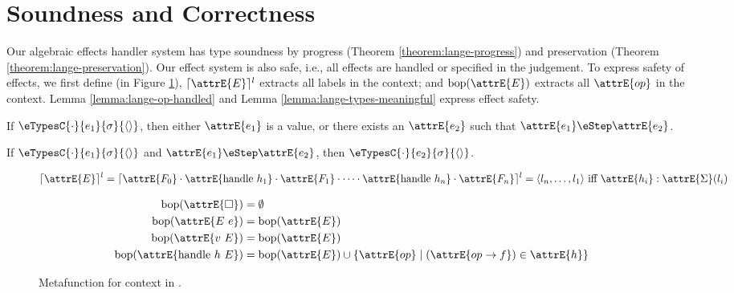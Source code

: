 \pagebreak
\section{Soundness and Correctness}

Our algebraic effects handler system has type soundness by progress
(Theorem \ref{theorem:lange-progress}) and preservation (Theorem
\ref{theorem:lange-preservation}). Our effect system is also safe, i.e., all
effects are handled or specified in the judgement. To express safety of effects,
we first define (in Figure \ref{fig:lange-metafunc}), $\lceil \attrE{E}
\rceil^l$ extracts all labels in the context; and $\text{bop}(\attrE{E})$
extracts all $\attrE{op}$ in the context. Lemma \ref{lemma:lange-op-handled} and
Lemma \ref{lemma:lange-types-meaningful} express effect safety.


\begin{theorem}
  \label{theorem:lange-progress}

  If $\eTypesC{\cdot}{e_1}{\sigma}{\langle \rangle}$, then either $\attrE{e_1}$ is a value, or there exists an $\attrE{e_2}$ such that $\attrE{e_1} \eStep \attrE{e_2}$.
\end{theorem}

\begin{theorem}
  \label{theorem:lange-preservation}

  If $\eTypesC{\cdot}{e_1}{\sigma}{\langle \rangle}$ and $\attrE{e_1} \eStep
  \attrE{e_2}$, then $\eTypesC{\cdot}{e_2}{\sigma}{\langle \rangle}$.
\end{theorem}

\begin{figure}
\[
  \lceil \attrE{E} \rceil^l = \lceil \attrE{F_0} \cdot \attrE{\text{handle} \ h_1} \cdot \attrE{F_1} \cdot \dots \cdot \attrE{\text{handle} \ h_n} \cdot \attrE{F_n} \rceil^l = \langle l_n, \dots, l_1 \rangle \text{ iff } \attrE{h_i} : \attrE{\Sigma}(l_i)
\]

\begin{align*}
  \text{bop}(\attrE{\square}) &= \emptyset \\
  \text{bop}(\attrE{E \ e}) &= \text{bop}(\attrE{E}) \\
  \text{bop}(\attrE{v \ E}) &= \text{bop}(\attrE{E}) \\
  \text{bop}(\attrE{\text{handle} \ h \ E}) &= \text{bop}(\attrE{E}) \cup \{ \attrE{op} \mid (\attrE{op \to f}) \in \attrE{h} \}
\end{align*}
\caption{Metafunction for context in \lange.}
\label{fig:lange-metafunc}
\end{figure}

